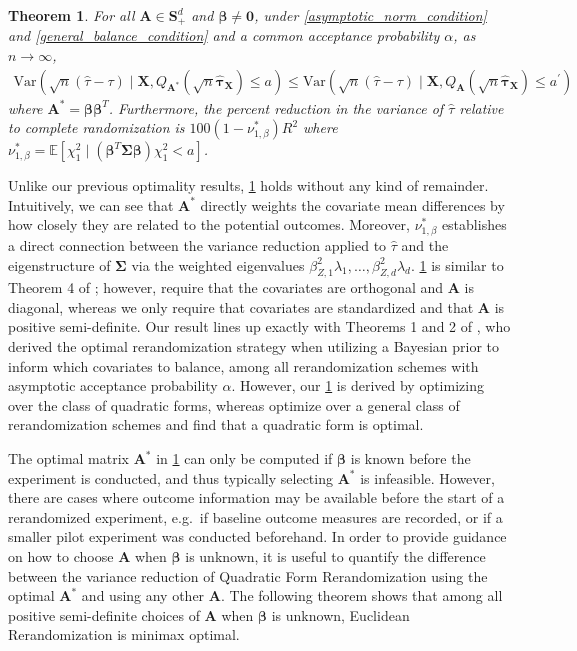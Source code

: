 \documentclass[11pt,twoside]{article}
\newtheorem{theorem}{Theorem}
\theoremstyle{definition}
\theoremstyle{remark}
\begin{document}
\begin{theorem} \label{optimal_a_outcomes}
     For all $\mathbf{A} \in \mathbf{S}^{d}_{+}$ and $\bm{\beta} \neq \mathbf{0}$, under \cref{asymptotic_norm_condition} and \cref{general_balance_condition} and a common acceptance probability $\alpha$, as $n \to \infty$, 
    \begin{align*}
        \text{Var}(\sqrt{n}(\widehat{\tau} - \tau)\mid \mathbf{X}, Q_{\mathbf{A}^*}(\sqrt{n} \widehat{\bm{\tau}}_{\mathbf{X}}) \leq a) \leq \text{Var}(\sqrt{n}(\widehat{\tau} - \tau) \mid \mathbf{X}, Q_{\mathbf{A}}(\sqrt{n} \widehat{\bm{\tau}}_{\mathbf{X}}) \leq a^\prime)
    \end{align*}
    where $\mathbf{A}^* = \bm{\beta}\bm{\beta}^T$. Furthermore, the percent reduction in the variance of $\widehat{\tau}$ relative to complete randomization is $100(1 - \nu^*_{1, \beta})R^2$ where $\nu^*_{1, \beta} = \mathbb{E}[\chi^2_1 \mid  \left(\bm{\beta}^T \mathbf{\Sigma} \bm{\beta}\right) \! \chi^2_1 < a]$.
\end{theorem}
Unlike our previous optimality results, \cref{optimal_a_outcomes} holds without any kind of remainder. Intuitively, we can see that $\mathbf{A}^*$ directly weights the covariate mean differences by how closely they are related to the potential outcomes. Moreover, $\nu^*_{1, \beta}$ establishes a direct connection between the variance reduction applied to $\widehat{\tau}$ and the eigenstructure of $\mathbf{\Sigma}$ via the weighted eigenvalues $\beta^2_{Z, 1} \lambda_1, \ldots, \beta^2_{Z, d}\lambda_d$. \cref{optimal_a_outcomes} is similar to Theorem 4 of \cite{lu2023design}; however, \cite{lu2023design} require that the covariates are orthogonal and $\mathbf{A}$ is diagonal, whereas we only require that covariates are standardized and that $\mathbf{A}$ is positive semi-definite. Our result lines up exactly with Theorems 1 and 2 of \cite{liu2023bayesian}, who derived the optimal rerandomization strategy when utilizing a Bayesian prior to inform which covariates to balance, among all rerandomization schemes with asymptotic acceptance probability $\alpha$. However, our \cref{optimal_a_outcomes} is derived by optimizing over the class of quadratic forms, whereas \cite{liu2023bayesian} optimize over a general class of rerandomization schemes and find that a quadratic form is optimal.

The optimal matrix $\mathbf{A}^*$ in \cref{optimal_a_outcomes} can only be computed if $\bm{\beta}$ is known before the experiment is conducted, and thus typically selecting $\mathbf{A}^*$ is infeasible. However, there are cases where outcome information may be available before the start of a rerandomized experiment, e.g.\ if baseline outcome measures are recorded, or if a smaller pilot experiment was conducted beforehand. In order to provide guidance on how to choose $\mathbf{A}$ when $\bm{\beta}$ is unknown, it is useful to quantify the difference between the variance reduction of Quadratic Form Rerandomization using the optimal $\mathbf{A}^*$ and using any other $\mathbf{A}$. The following theorem shows that among all positive semi-definite choices of $\mathbf{A}$ when $\bm{\beta}$ is unknown, Euclidean Rerandomization is minimax optimal.
\end{document}
